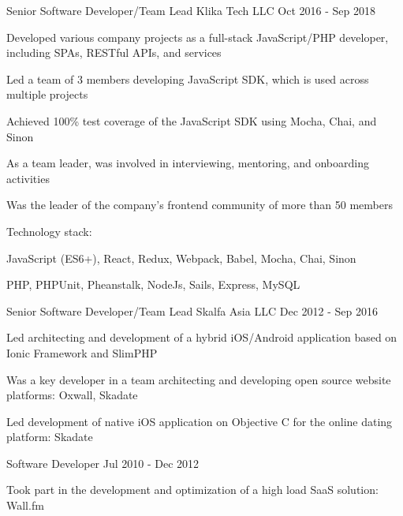 \begin{cventries}
  \cventry
    {Senior Software Developer/Team Lead} %
    {Klika Tech LLC} %
    {} %
    {Oct 2016 - Sep 2018} %
    {
      \begin{cvitems}
        \item Developed various company projects as a full-stack JavaScript/PHP developer, including SPAs, RESTful APIs, and services
        \item Led a team of 3 members developing JavaScript SDK, which is used across multiple projects
        \item Achieved 100\% test coverage of the JavaScript SDK using Mocha, Chai, and Sinon
        \item As a team leader, was involved in interviewing, mentoring, and onboarding activities
        \item Was the leader of the company's frontend community of more than 50 members
      \end{cvitems}
      \vspace{5mm}
      Technology stack:
      \begin{cvstackitems}
        \item JavaScript (ES6+), React, Redux, Webpack, Babel, Mocha, Chai, Sinon
        \item PHP, PHPUnit, Pheanstalk, NodeJs, Sails, Express, MySQL
      \end{cvstackitems}
      \vspace{-4.0mm}
    }

  \cventry
    {Senior Software Developer/Team Lead} %
    {Skalfa Asia LLC} %
    {} %
    {Dec 2012 - Sep 2016} %
    {
      \begin{cvitems}
        \item Led architecting and development of a hybrid iOS/Android application based on Ionic Framework and SlimPHP
        \item Was a key developer in a team architecting and developing open source website platforms: Oxwall, Skadate
        \item Led development of native iOS application on Objective C for the online dating platform: Skadate
      \end{cvitems}
    }

  \cventry
    {Software Developer} %
    {} %
    {} %
    {Jul 2010 - Dec 2012} %
    {
      \begin{cvitems}
        \item Took part in the development and optimization of a high load SaaS solution: Wall.fm
      \end{cvitems}
    }


\end{cventries}

